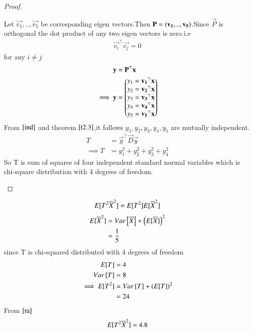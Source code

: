 \documentclass[journal,12pt,twocolumn]{IEEEtran}
\begin{document}
\begin{proof}
\begin{enumerate}
\begin{enumerate}
    Let $\vec{v_1},..,\vec{v_5}$ be corresponding eigen vectors.Then $\mathbf{P}=\left(\mathbf{v_1},..,\mathbf{v_5}\right)$.Since $\vec{P}$ is orthogonal the dot product of any two eigen vectors is zero.i.e
    \begin{align}
        \vec{v_i}^{\top}\vec{v_j}=0 \label{ind}
    \end{align}
    for any $i\neq j$
    \begin{align}
     \mathbf{y}&=\mathbf{P}^{\top}\mathbf{x}\\
     \implies 
        \mathbf{y}&=\begin{pmatrix}y_1=\mathbf{v_1}^{\top}\mathbf{x}\\
                       y_2=\mathbf{v_2}^{\top}\mathbf{x}\\
                       y_3=\mathbf{v_3}^{\top}\mathbf{x}\\
                       y_4=\mathbf{v_4}^{\top}\mathbf{x}\\
                       y_5=\mathbf{v_5}^{\top}\mathbf{x}\end{pmatrix}\\
    \end{align}
    From $\eqref{ind}$ and theorem $\ref{t2.3}$,it follows $y_1,y_2,y_3,y_4,y_5$ are mutually independent.
    \begin{align}
    T&=\vec{y}^{\top}\vec{D}\vec{y}\\
        \implies
         T&=y_1^2+y_2^2+y_3^2+y_4^2 
    \end{align}
    So T is sum of squares of four independent standard normal variables which is chi-square distribution with 4 degrees of freedom.
\end{enumerate}
\end{enumerate}
\end{proof}
\begin{align}
    E[ T^2\overline{X}^2 ]=E[ T^2 ]E[ \overline{X}^2 ]\label{ra}
\end{align}
\begin{align}
    E[ \overline{X}^2 ]&=Var{}\left[\overline{X}\right]+\left(E[ \overline{X} ]\right)^2\\
    &=\frac{1}{5}
\end{align}
 since T is chi-squared distributed with 4 degrees of freedom
 \begin{align}
     E[ T ]&=4\\
     Var{}\left[T\right]&=8\\
     \implies E[ T^2 ]&=Var{}\left[T\right]+\left(E[ T ]\right)^2\\
    &=24
 \end{align}
 From $\eqref{ra}$
\begin{align}
    E[ T^2\overline{X}^2 ]=4.8
\end{align}
\end{document}
